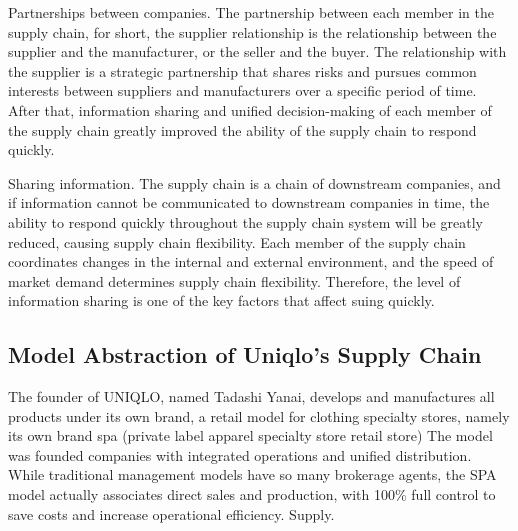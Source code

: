 \documentclass[12pt,]{article}
\begin{document}
Partnerships between companies. The partnership between each member in
the supply chain, for short, the supplier relationship is the
relationship between the supplier and the manufacturer, or the seller
and the buyer. The relationship with the supplier is a strategic
partnership that shares risks and pursues common interests between
suppliers and manufacturers over a specific period of time. After that,
information sharing and unified decision-making of each member of the
supply chain greatly improved the ability of the supply chain to respond
quickly.

Sharing information. The supply chain is a chain of downstream
companies, and if information cannot be communicated to downstream
companies in time, the ability to respond quickly throughout the supply
chain system will be greatly reduced, causing supply chain flexibility.
Each member of the supply chain coordinates changes in the internal and
external environment, and the speed of market demand determines supply
chain flexibility. Therefore, the level of information sharing is one of
the key factors that affect suing quickly.

\hypertarget{model-abstraction-of-uniqlos-supply-chain}{%
\subsection{Model Abstraction of Uniqlo's Supply
Chain}\label{model-abstraction-of-uniqlos-supply-chain}}

The founder of UNIQLO, named Tadashi Yanai, develops and manufactures
all products under its own brand, a retail model for clothing specialty
stores, namely its own brand spa (private label apparel specialty store
retail store) The model was founded companies with integrated operations
and unified distribution. While traditional management models have so
many brokerage agents, the SPA model actually associates direct sales
and production, with 100\% full control to save costs and increase
operational efficiency. Supply.
\end{document}
